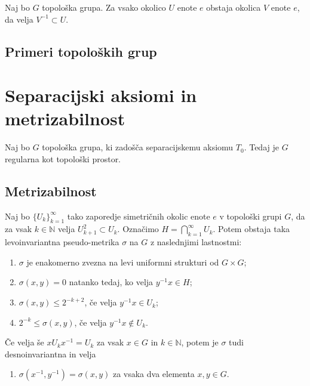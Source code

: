 \documentclass[mat1]{fmfdelo}
\newcommand{\N}{\mathbb N}
\begin{document}
\begin{posledica}\label{pos:sim}
Naj bo $G$ topološka grupa. Za vsako okolico $U$ enote $e$ obstaja okolica $V$ enote $e$, da velja $V^{-1} \subset U$.
\end{posledica}


\subsection{Primeri topoloških grup}


\section{Separacijski aksiomi in metrizabilnost}


\begin{izrek}\label{izr:t3}
Naj bo $G$ topološka grupa, ki zadošča separacijskemu aksiomu $T_0$. Tedaj je $G$ regularna kot topološki prostor.
\end{izrek}

\subsection{Metrizabilnost}

\begin{izrek}\label{izr:pseudometrika}
Naj bo $\lbrace U_k \rbrace_{k = 1}^{\infty}$ tako zaporedje simetričnih okolic enote $e$ v topološki grupi $G$, da za vsak $k \in \N$ velja $U_{k+1}^2 \subset U_k$. Označimo $H = \bigcap_{k=1}^{\infty} U_k$. Potem obstaja taka levoinvariantna pseudo-metrika $\sigma$ na $G$ z naslednjimi lastnostmi:
\begin{enumerate}
\item $\sigma$ je enakomerno zvezna na levi uniformni strukturi od $G \times G$;
\item $\sigma (x, y) = 0$ natanko tedaj, ko velja $y^{-1}x \in H$;
\item $\sigma (x, y) \leq 2^{-k+2}$, če velja $y^{-1}x \in U_k$;
\item $2^{-k} \leq \sigma (x, y)$, če velja $y^{-1}x \notin U_k$.
\end{enumerate}

Če velja še $x U_k x^{-1} = U_k$ za vsak $x \in G$ in $k \in \N$, potem je $\sigma$ tudi desnoinvariantna in velja
\begin{enumerate}[resume]
\item $\sigma (x^{-1}, y^{-1}) = \sigma (x, y)$ za vsaka dva elementa $x, y \in G$.
\end{enumerate}
\end{izrek}
\end{document}
